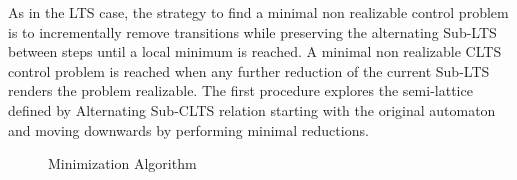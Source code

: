 
As in the LTS case, the strategy to find a minimal non realizable control problem is to incrementally remove transitions while preserving the alternating Sub-LTS between steps until a local minimum is reached.  A minimal non realizable CLTS control problem is reached when any further reduction of the current Sub-LTS renders the problem realizable.
The first procedure explores the semi-lattice defined by Alternating Sub-CLTS relation starting with the original automaton and moving downwards by performing minimal reductions. 

\begin{figure}[ht]
	\begin{center}
		 
		\caption{Minimization Algorithm}
		\label{fig:clts_dfs-code}
	\end{center}
\end{figure}

